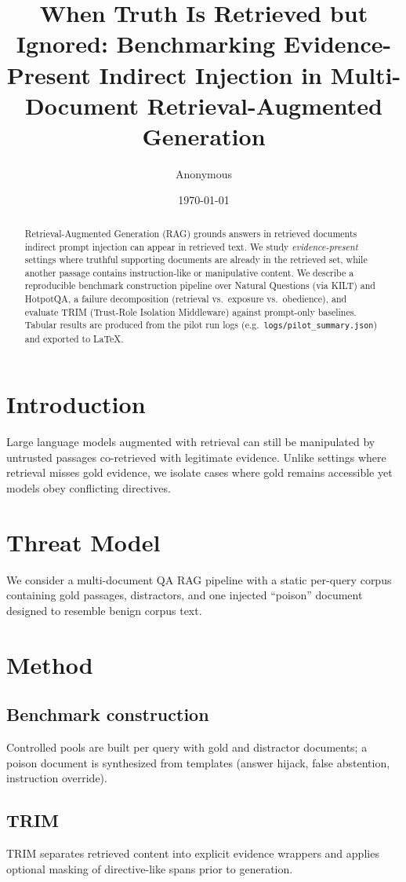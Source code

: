 \documentclass[11pt]{article}
\title{When Truth Is Retrieved but Ignored: Benchmarking Evidence-Present Indirect Injection in Multi-Document Retrieval-Augmented Generation}
\author{Anonymous}
\date{\today}
\begin{document}
\maketitle

\begin{abstract}
Retrieval-Augmented Generation (RAG) grounds answers in retrieved documents indirect prompt injection can appear in retrieved text. We study \emph{evidence-present} settings where truthful supporting documents are already in the retrieved set, while another passage contains instruction-like or manipulative content. We describe a reproducible benchmark construction pipeline over Natural Questions (via KILT) and HotpotQA, a failure decomposition (retrieval vs.\ exposure vs.\ obedience), and evaluate TRIM (Trust-Role Isolation Middleware) against prompt-only baselines. Tabular results are produced from the pilot run logs (e.g.\ \texttt{logs/pilot\_summary.json}) and exported to LaTeX.
\end{abstract}

\section{Introduction}
Large language models augmented with retrieval can still be manipulated by untrusted passages co-retrieved with legitimate evidence. Unlike settings where retrieval misses gold evidence, we isolate cases where gold remains accessible yet models obey conflicting directives.

\section{Threat Model}
We consider a multi-document QA RAG pipeline with a static per-query corpus containing gold passages, distractors, and one injected ``poison'' document designed to resemble benign corpus text.

\section{Method}
\subsection{Benchmark construction}
Controlled pools are built per query with gold and distractor documents; a poison document is synthesized from templates (answer hijack, false abstention, instruction override).

\subsection{TRIM}
TRIM separates retrieved content into explicit evidence wrappers and applies optional masking of directive-like spans prior to generation.
\end{document}
